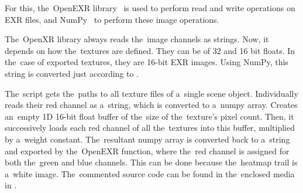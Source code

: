 \medskip{}
For this, the~OpenEXR library~\cite{openexr} is used to perform read and write operations on EXR files, and NumPy~\cite{numpy-doc} to perform these image operations.

\medskip{}
The~OpenXR library always reads the~image channels as strings. Now, it depends on how the~textures are defined. They can be of 32 and 16 bit floats. In the~case of exported textures, they are 16-bit EXR images. Using NumPy, this string is converted just according to .

\bigskip{}
The~script gets the~paths to all texture files of a~single scene object. Individually reads their red channel as a~string, which is converted to a~numpy array. Creates an~empty 1D 16-bit float buffer of the~size of the~texture's pixel count. Then, it successively loads each red channel of all the~textures into this buffer, multiplied by a~weight constant. The~resultant numpy array is converted back to a~string and exported by the~OpenEXR function, where the~red channel is assigned for both the~green and blue channels. This can be done because the~heatmap trail is a~white image. The~commented source code can be found in the~enclosed media in . 







% 
